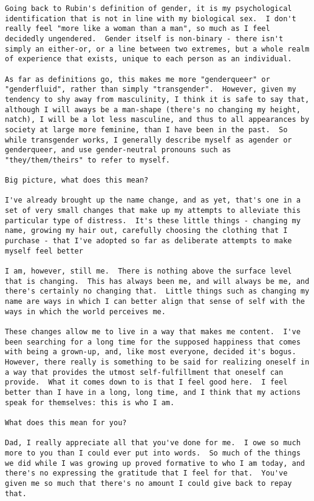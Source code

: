 \begin{verbatim}
Going back to Rubin's definition of gender, it is my psychological identification that is not in line with my biological sex.  I don't really feel "more like a woman than a man", so much as I feel decidedly ungendered.  Gender itself is non-binary - there isn't simply an either-or, or a line between two extremes, but a whole realm of experience that exists, unique to each person as an individual.

As far as definitions go, this makes me more "genderqueer" or "genderfluid", rather than simply "transgender".  However, given my tendency to shy away from masculinity, I think it is safe to say that, although I will aways be a man-shape (there's no changing my height, natch), I will be a lot less masculine, and thus to all appearances by society at large more feminine, than I have been in the past.  So while transgender works, I generally describe myself as agender or genderqueer, and use gender-neutral pronouns such as "they/them/theirs" to refer to myself.

Big picture, what does this mean?

I've already brought up the name change, and as yet, that's one in a set of very small changes that make up my attempts to alleviate this particular type of distress.  It's these little things - changing my name, growing my hair out, carefully choosing the clothing that I purchase - that I've adopted so far as deliberate attempts to make myself feel better

I am, however, still me.  There is nothing above the surface level that is changing.  This has always been me, and will always be me, and there's certainly no changing that.  Little things such as changing my name are ways in which I can better align that sense of self with the ways in which the world perceives me.

These changes allow me to live in a way that makes me content.  I've been searching for a long time for the supposed happiness that comes with being a grown-up, and, like most everyone, decided it's bogus.  However, there really is something to be said for realizing oneself in a way that provides the utmost self-fulfillment that oneself can provide.  What it comes down to is that I feel good here.  I feel better than I have in a long, long time, and I think that my actions speak for themselves: this is who I am.

What does this mean for you?

Dad, I really appreciate all that you've done for me.  I owe so much more to you than I could ever put into words.  So much of the things we did while I was growing up proved formative to who I am today, and there's no expressing the gratitude that I feel for that.  You've given me so much that there's no amount I could give back to repay that.


\end{verbatim}
